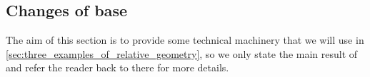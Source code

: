 

\subsection{Changes of base} %
\label{sub:changes_of_bases}


    The aim of this section is to provide some technical machinery that we will use in \cref{sec:three_examples_of_relative_geometry}, so we only state the main result of \cite[\S2.5]{Toen:2005wxa} and refer the reader back to there for more details.




